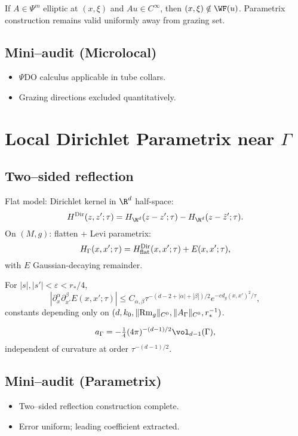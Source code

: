 \begin{proposition}
If $A\in\Psi^m$ elliptic at $(x,\xi)$ and $Au\in C^\infty$, then $(x,\xi)\notin \WF(u)$. 
Parametrix construction remains valid uniformly away from grazing set.
\end{proposition}

\subsection*{Mini–audit (Microlocal)}
\begin{itemize}
  \item $\Psi$DO calculus applicable in tube collars.
  \item Grazing directions excluded quantitatively.
\end{itemize}

\section{Local Dirichlet Parametrix near $\Gamma$}
\label{sec:parametrix-gamma}

\subsection{Two–sided reflection}
Flat model: Dirichlet kernel in $\R^d$ half-space:
\[
H^{\rm Dir}(z,z';\tau)=H_{\R^d}(z-z';\tau)-H_{\R^d}(z-\tilde z';\tau).
\]
On $(M,g)$: flatten + Levi parametrix:
\[
H_\Gamma(x,x';\tau)=H^{\rm Dir}_{\rm flat}(x,x';\tau)+E(x,x';\tau),
\]
with $E$ Gaussian-decaying remainder.

\begin{proposition}
\label{prop:uniform-E}
For $|s|,|s'|<\varepsilon<r_*/4$, 
\[
|\partial_x^\alpha \partial_{x'}^\beta E(x,x';\tau)|
\le C_{\alpha,\beta}\tau^{-(d-2+|\alpha|+|\beta|)/2} e^{-c d_g(x,x')^2/\tau},
\]
constants depending only on $(d,k_0,\|{\rm Rm}_g\|_{C^0},\|A_\Gamma\|_{C^0},r_*^{-1})$.
\end{proposition}

\begin{corollary}
\[
a_\Gamma=-\tfrac14(4\pi)^{-(d-1)/2}\vol_{d-1}(\Gamma),
\]
independent of curvature at order $\tau^{-(d-1)/2}$.
\end{corollary}

\subsection*{Mini–audit (Parametrix)}
\begin{itemize}
  \item Two–sided reflection construction complete.
  \item Error uniform; leading coefficient extracted.
\end{itemize}

